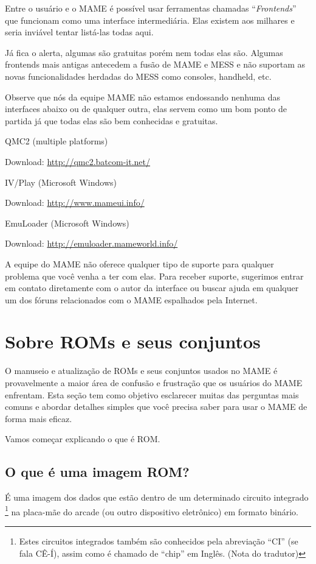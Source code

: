 \documentclass[letterpaper,10pt,brazil]{sphinxmanual}
\begin{document}
Entre o usuário e o MAME é possível usar ferramentas chamadas
``\emph{Frontends}'' que funcionam como uma interface intermediária. Elas
existem aos milhares e seria inviável tentar listá-las todas aqui.

Já fica o alerta, algumas são gratuitas porém nem todas elas são.
Algumas frontends mais antigas antecedem a fusão de MAME e MESS e não
suportam as novas funcionalidades herdadas do MESS como consoles,
handheld, etc.

Observe que nós da equipe MAME não estamos endossando nenhuma das
interfaces abaixo ou de qualquer outra, elas servem como um bom ponto
de partida já que todas elas são bem conhecidas e gratuitas.

\begin{DUlineblock}{0em}
\item[] QMC2 (multiple platforms)
\item[] Download: \url{http://qmc2.batcom-it.net/}
\item[] 
\item[] IV/Play (Microsoft Windows)
\item[] Download: \url{http://www.mameui.info/}
\item[] 
\item[] EmuLoader (Microsoft Windows)
\item[] Download: \url{http://emuloader.mameworld.info/}
\end{DUlineblock}

A equipe do MAME não oferece qualquer tipo de suporte para qualquer
problema que você venha a ter com elas. Para receber suporte, sugerimos
entrar em contato diretamente com o autor da interface ou buscar ajuda
em qualquer um dos fóruns relacionados com o MAME espalhados pela
Internet.
\clearpage

\section{Sobre ROMs e seus conjuntos}
\label{usingmame/aboutromsets:sobre-roms-e-seus-conjuntos}\label{usingmame/aboutromsets::doc}
O manuseio e atualização de ROMs e seus conjuntos usados no MAME é
provavelmente a maior área de confusão e frustração que os usuários
do MAME enfrentam.
Esta seção tem como objetivo esclarecer muitas das perguntas mais
comuns e abordar detalhes simples que você precisa saber para usar
o MAME de forma mais eficaz.

Vamos começar explicando o que é ROM.


\subsection{O que é uma imagem ROM?}
\label{usingmame/aboutromsets:o-que-e-uma-imagem-rom}
É uma imagem dos dados que estão dentro de um determinado circuito
integrado \footnote[1]{\sphinxAtStartFootnote%
Estes circuitos integrados também são conhecidos pela abreviação
``CI'' (se fala CÊ-Í), assim como é chamado de ``chip'' em Inglês.
(Nota do tradutor)
} na placa-mãe do arcade (ou outro dispositivo eletrônico)
em formato binário.
\end{document}
